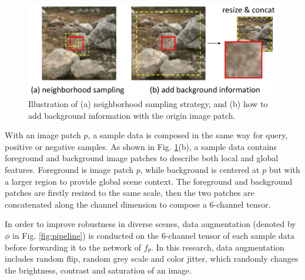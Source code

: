 \documentclass[letterpaper, 10 pt, conference]{ieeeconf}  %
\begin{document}
\begin{figure}[]
	\centering
	\includegraphics[scale=0.235]{dataaug.pdf}
	\caption{Illustration of (a) neighborhood sampling strategy, and (b) how to add background information with the origin image patch.}
	\label{fig:dataaug}
\end{figure}
With an image patch $p$, a sample data is composed in the same way for query, positive or negative samples.
As shown in Fig. \ref{fig:dataaug}(b), a sample data contains foreground and background image patches to describe both local and global features. Foreground is image patch $p$, while background is centered at $p$ but with a larger region to provide global scene context. The foreground and background patches are firstly resized to the same scale, then the two patches are concatenated along the channel dimension to compose a 6-channel tensor.

In order to improve robustness in diverse scenes, data augmentation (denoted by $\phi$ in Fig. \ref{fig:pipeline}) is conducted on the 6-channel tensor of each sample data before forwarding it to the network of $f_{\theta}$. In this research, data augmentation includes random flip, random grey scale and color jitter, which randomly changes the brightness, contrast and saturation of an image.
\end{document}

